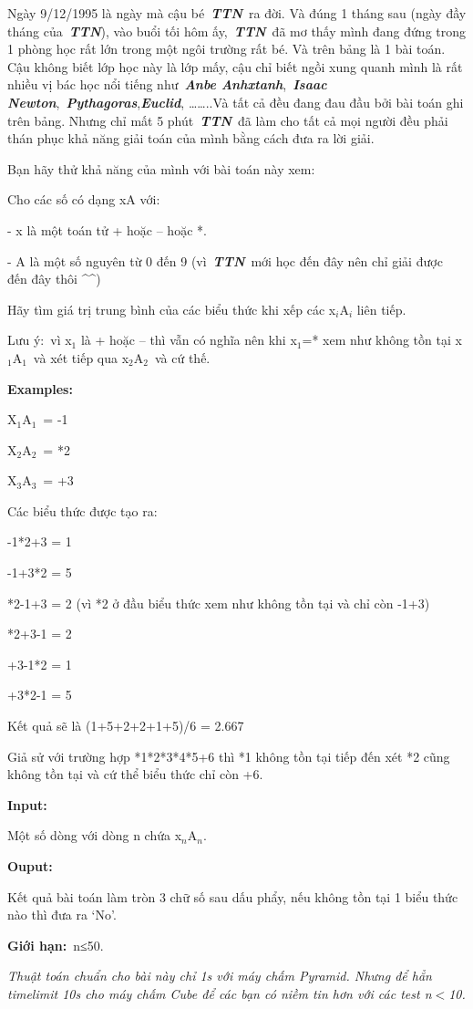 

Ngày 9/12/1995 là ngày mà cậu bé \textbf{\emph{TTN}} ra đời. Và đúng 1 tháng sau (ngày đầy tháng của \textbf{\emph{TTN}}), vào buổi tối hôm ấy, \textbf{\emph{TTN}} đã mơ thấy mình đang đứng trong 1 phòng học rất lớn trong một ngôi trường rất bé. Và trên bảng là 1 bài toán. Cậu không biết lớp học này là lớp mấy, cậu chỉ biết ngồi xung quanh mình là rất nhiều vị bác học nổi tiếng như \textbf{\emph{Anbe Anhxtanh}}, \textbf{\emph{Isaac Newton}}, \textbf{\emph{Pythagoras}},\textbf{\emph{Euclid}}, ……..Và tất cả đều đang đau đầu bởi bài toán ghi trên bảng. Nhưng chỉ mất 5 phút \textbf{\emph{TTN}} đã làm cho tất cả mọi người đều phải thán phục khả năng giải toán của mình bằng cách đưa ra lời giải.

Bạn hãy thử khả năng của mình với bài toán này xem:

Cho các số có dạng xA với:

- x là một toán tử + hoặc – hoặc *.

- A là một số nguyên từ 0 đến 9 (vì \textbf{\emph{TTN}} mới học đến đây nên chỉ giải được đến đây thôi \textasciicircum\textasciicircum)

Hãy tìm giá trị trung bình của các biểu thức khi xếp các x$_i$A$_i$ liên tiếp.

Lưu ý: vì x$_1$ là + hoặc – thì vẫn có nghĩa nên khi x$_1$=* xem như không tồn tại x$_1$A$_1$ và xét tiếp qua x$_2$A$_2$ và cứ thế.

\textbf{Examples:}

X$_1$A$_1$ = -1

X$_2$A$_2$ = *2

X$_3$A$_3$ = +3

Các biểu thức được tạo ra:

-1*2+3 = 1

-1+3*2 = 5

*2-1+3 = 2 (vì *2 ở đầu biểu thức xem như không tồn tại và chỉ còn -1+3)

*2+3-1 = 2

+3-1*2 = 1

+3*2-1 = 5

Kết quả sẽ là (1+5+2+2+1+5)/6 = 2.667

Giả sử với trường hợp *1*2*3*4*5+6 thì *1 không tồn tại tiếp đến xét *2 cũng không tồn tại và cứ thể biểu thức chỉ còn +6.

\textbf{Input:}

Một số dòng với dòng n chứa x$_n$A$_n$.

\textbf{Ouput:}

Kết quả bài toán làm tròn 3 chữ số sau dấu phẩy, nếu không tồn tại 1 biểu thức nào thì đưa ra ‘No’.

\textbf{Giới hạn:} n≤50.

\emph{Thuật toán chuẩn cho bài này chỉ 1s với máy chấm Pyramid. Nhưng để hẳn timelimit 10s cho máy chấm Cube để các bạn có niềm tin hơn với các test n$<$10.}